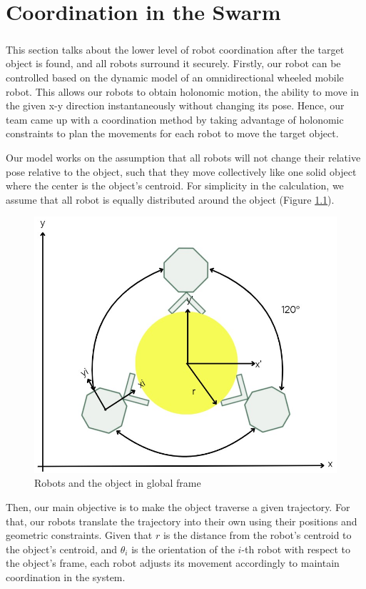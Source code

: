 \chapter{Coordination in the Swarm}

\paragraph*{}
This section talks about the lower level of robot coordination after the target object is found, and all robots surround it securely. Firstly, our robot can be controlled based on the dynamic model of an omnidirectional wheeled mobile robot. This allows our robots to obtain holonomic motion, the ability to move in the given x-y direction instantaneously without changing its pose. Hence, our team came up with a coordination method by taking advantage of holonomic constraints to plan the movements for each robot to move the target object.

Our model works on the assumption that all robots will not change their relative pose relative to the object, such that they move collectively like one solid object where the center is the object's centroid. For simplicity in the calculation, we assume that all robot is equally distributed around the object (Figure \ref{fig:coordination-diagram}).

\begin{figure} [H]
    \centering
    \includegraphics[width=0.3\linewidth]{assets/images/coordination/robots_with_object.jpg}
    \caption{Robots and the object in global frame}
    \label{fig:coordination-diagram}
\end{figure}

Then, our main objective is to make the object traverse a given trajectory. For that, our robots translate the trajectory into their own using their positions and geometric constraints. Given that \( r \) is the distance from the robot's centroid to the object's centroid, and \( \theta_i \) is the orientation of the \( i \)-th robot with respect to the object's frame, each robot adjusts its movement accordingly to maintain coordination in the system.

